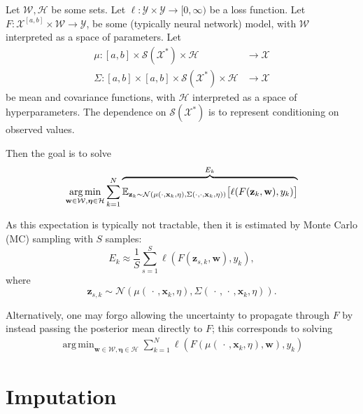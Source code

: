 \documentclass{article}
\DeclareMathOperator*{\argmin}{arg\,min}
\newcommand{\reals}{\mathbb{R}}
\newcommand{\dataspace}{\mathcal{X}}
\newcommand{\lspace}{\mathcal{Y}}
\newcommand{\seriesspace}{\mathcal{S}}
\begin{document}
Let $\mathcal{W}, \mathcal{H}$ be some sets. Let $\ell \colon \lspace \times \lspace \to [0, \infty)$ be a loss function. Let $F \colon \dataspace^{[a, b]} \times \mathcal{W} \to \lspace$, be some (typically neural network) model, with $\mathcal{W}$ interpreted as a space of parameters. Let
\begin{align*}
\mu \colon [a, b] \times \seriesspace(\dataspace^*) \times \mathcal{H} &\to \dataspace\\
\Sigma \colon [a, b] \times [a, b] \times \seriesspace(\dataspace^*) \times \mathcal{H} &\to \dataspace    
\end{align*}
be mean and covariance functions, with $\mathcal{H}$ interpreted as a space of hyperparameters. The dependence on $\seriesspace(\dataspace^*)$ is to represent conditioning on observed values.

Then the goal is to solve
\begin{equation}\label{eq:gp-mc}
\argmin_{\mathbf{w} \in \mathcal{W},\bm{\eta} \in \mathcal{H}} \sum_{k=1}^N \overbrace{\rule{0pt}{0.5cm} \mathbb{E}_{\mathbf{z}_k \sim \mathcal{N}\left( \mu(\cdot, \mathbf{x}_k, \eta), \Sigma(\cdot, \cdot, \mathbf{x}_k, \eta)\right) } \big[ \ell(F(\mathbf{z}_k, \mathbf{w}), y_k) \big] }^{\text{$E_k$}} 
\end{equation}

As this expectation is typically not tractable, then it is estimated by Monte Carlo (MC) sampling with $S$ samples:
\begin{equation*}
E_k \approx \frac{1}{S} \sum_{s=1}^{S} \ell(F(\mathbf{z}_{s, k}, \mathbf{w}), y_k),
\end{equation*}
where
\begin{equation*}
    \mathbf{z}_{s, k} \sim \mathcal{N}\left( \mu(\,\cdot\,, \mathbf{x}_k, \eta), \Sigma(\,\cdot\,, \,\cdot\,, \mathbf{x}_k, \eta)\right).
\end{equation*}

Alternatively, one may forgo allowing the uncertainty to propagate through $F$ by instead passing the posterior mean directly to $F$; this corresponds to solving
\begin{align}\label{eq:gp-mean}
\argmin_{\mathbf{w} \in \mathcal{W},\bm{\eta} \in \mathcal{H}} \sum_{k=1}^N \ell(F(\mu(\,\cdot\,,\mathbf{x}_k, \eta), \mathbf{w}), y_k)
\end{align}

\section{Imputation}
\end{document}
